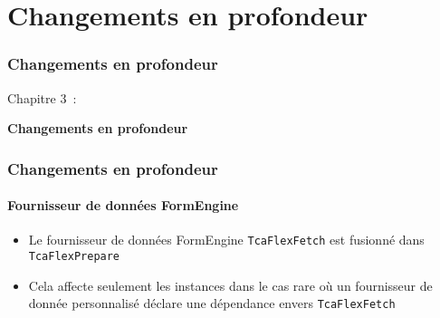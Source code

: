 %

\section{Changements en profondeur}
\begin{frame}[fragile]
	\frametitle{Changements en profondeur}

	\begin{center}\huge{Chapitre 3~:}\end{center}
	\begin{center}\huge{\color{typo3darkgrey}\textbf{Changements en profondeur}}\end{center}

\end{frame}


\begin{frame}[fragile]
	\frametitle{Changements en profondeur}
	\framesubtitle{Fournisseur de données FormEngine}

	\begin{itemize}
		\item Le fournisseur de données FormEngine \texttt{TcaFlexFetch} est
			fusionné dans \texttt{TcaFlexPrepare}
		\item Cela affecte seulement les instances dans le cas rare où un fournisseur
			de donnée personnalisé déclare une dépendance envers \texttt{TcaFlexFetch}
	\end{itemize}

\end{frame}

